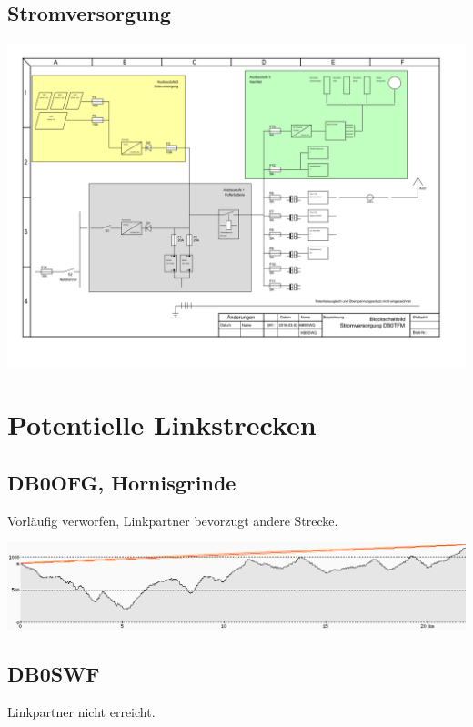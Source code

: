 \documentclass[a4paper]{scrartcl}
\begin{document}
\subsection{Stromversorgung}

\includegraphics[height=\linewidth, angle=90]{Bilder/Blockschaltbild_Stromversorgung.png}

\section{Potentielle Linkstrecken}
\subsection{DB0OFG, Hornisgrinde}
Vorl\"aufig verworfen, Linkpartner bevorzugt andere Strecke.

\includegraphics[width=\linewidth]{Bilder/Profil_DB0OFG.png}

\subsection{DB0SWF}
Linkpartner nicht erreicht.
\end{document}
